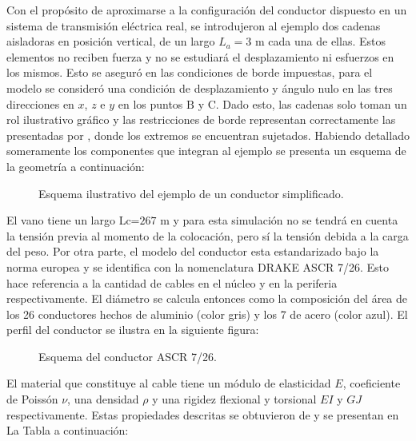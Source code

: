 Con el propósito de aproximarse a la configuración del conductor dispuesto en un sistema de transmisión eléctrica real, se introdujeron al ejemplo dos cadenas aisladoras en posición vertical, de un largo $L_a=3$ m cada una de ellas. Estos elementos no reciben fuerza y no se estudiará el desplazamiento ni esfuerzos en los mismos. Esto se aseguró en las condiciones de borde impuestas, para el modelo se consideró una condición de desplazamiento y ángulo nulo en las tres direcciones en $x$, $z$ e $y$ en los puntos $\text{B}$ y $\text{C}$. Dado esto, las cadenas solo toman un rol ilustrativo gráfico y las restricciones de borde representan correctamente las presentadas por \cite{foti2018finite}, donde los extremos se encuentran sujetados. Habiendo detallado someramente los componentes que integran al ejemplo se presenta un esquema de la geometría a continuación:

\begin{figure}[htbp]
	\centering
	\def\svgwidth{80mm}
	
	\caption{Esquema ilustrativo del ejemplo de un conductor simplificado.}
	\label{fig:RN:FotiCable:Ilustracion}
\end{figure}


El vano tiene un largo Lc=$267$ m y para esta simulación no se tendrá en cuenta la tensión previa al momento de la colocación, pero sí la tensión debida a la carga del peso. Por otra parte, el modelo del conductor esta estandarizado bajo la norma europea \cite{IEC60826} y se identifica con la nomenclatura DRAKE ASCR 7/26. Esto hace referencia a la cantidad de cables en el núcleo y en la periferia respectivamente. El diámetro se calcula entonces como la composición del área de los 26 conductores hechos de aluminio (color gris) y los 7 de acero (color azul). El perfil del conductor se ilustra en la siguiente figura: 

\begin{figure}[htbp]
	\centering
	\def\svgwidth{80mm}
	
	\caption{Esquema del conductor  ASCR 7/26.}
	\label{fig:RN:FotiCable:Perfil}
\end{figure}
El material que constituye al cable tiene un módulo de elasticidad $E$, coeficiente de Poissón $\nu$, una densidad $\rho$ y una rigidez flexional y torsional $EI$ y $GJ$ respectivamente. Estas propiedades descritas se obtuvieron de \cite{Foti2016} y se presentan en La Tabla a continuación:

